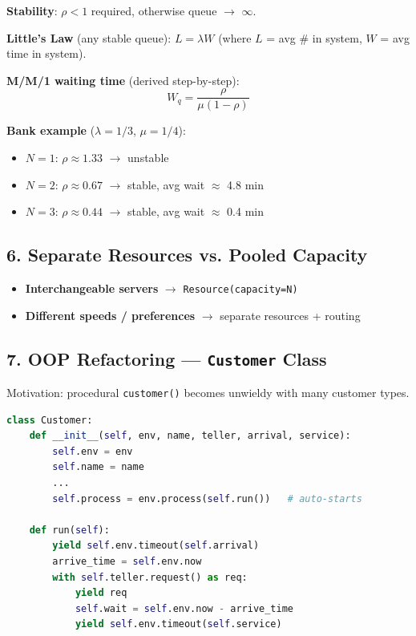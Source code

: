 \documentclass[11pt]{article}
\begin{document}
\textbf{Stability}: \(\rho < 1\) required, otherwise queue $\rightarrow$ $\infty$.

\textbf{Little's Law} (any stable queue): \(L = \lambda W\)  
(where \(L\) = avg \# in system, \(W\) = avg time in system).

\textbf{M/M/1 waiting time} (derived step-by-step):
\[
W_q = \frac{\rho}{\mu(1-\rho)}
\]

\textbf{Bank example} (\(\lambda = 1/3\), \(\mu = 1/4\)):
\begin{itemize}[leftmargin=*]
\item \(N=1\): \(\rho \approx 1.33\) $\rightarrow$ unstable
\item \(N=2\): \(\rho \approx 0.67\) $\rightarrow$ stable, avg wait $\approx$ 4.8 min
\item \(N=3\): \(\rho \approx 0.44\) $\rightarrow$ stable, avg wait $\approx$ 0.4 min
\end{itemize}

\subsection*{6. Separate Resources vs. Pooled Capacity}
\begin{itemize}[leftmargin=*]
\item \textbf{Interchangeable servers} $\rightarrow$ \texttt{Resource(capacity=N)}
\item \textbf{Different speeds / preferences} $\rightarrow$ separate resources + routing
\end{itemize}

\subsection*{7. OOP Refactoring --- \texttt{Customer} Class}
Motivation: procedural \texttt{customer()} becomes unwieldy with many customer types.

\begin{lstlisting}[language=Python]
class Customer:
    def __init__(self, env, name, teller, arrival, service):
        self.env = env
        self.name = name
        ...
        self.process = env.process(self.run())   # auto-starts

    def run(self):
        yield self.env.timeout(self.arrival)
        arrive_time = self.env.now
        with self.teller.request() as req:
            yield req
            self.wait = self.env.now - arrive_time
            yield self.env.timeout(self.service)
\end{lstlisting}
\end{document}
